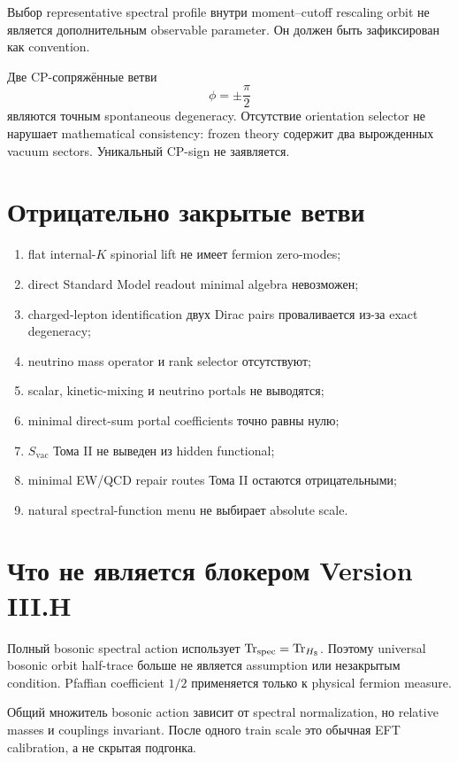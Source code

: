 Выбор representative spectral profile внутри moment--cutoff rescaling
orbit не является дополнительным observable parameter. Он должен быть
зафиксирован как convention.

Две CP-сопряжённые ветви
\begin{equation}
 \phi=\pm\frac{\pi}{2}
\end{equation}
являются точным spontaneous degeneracy. Отсутствие orientation selector
не нарушает mathematical consistency: frozen theory содержит два
вырожденных vacuum sectors. Уникальный CP-sign не заявляется.

\section{Отрицательно закрытые ветви}

\begin{enumerate}
 \item flat internal-\(K\) spinorial lift не имеет fermion zero-modes;
 \item direct Standard Model readout minimal algebra невозможен;
 \item charged-lepton identification двух Dirac pairs проваливается из-за
 exact degeneracy;
 \item neutrino mass operator и rank selector отсутствуют;
 \item scalar, kinetic-mixing и neutrino portals не выводятся;
 \item minimal direct-sum portal coefficients точно равны нулю;
 \item \(S_{\mathrm{vac}}\) Тома II не выведен из hidden functional;
 \item minimal EW/QCD repair routes Тома II остаются отрицательными;
 \item natural spectral-function menu не выбирает absolute scale.
\end{enumerate}

\section{Что не является блокером Version III.H}

Полный bosonic spectral action использует
\(\operatorname{Tr}_{\mathrm{spec}}=\operatorname{Tr}_{H_8}\). Поэтому universal bosonic
orbit half-trace больше не является assumption или незакрытым condition.
Pfaffian coefficient \(1/2\) применяется только к physical fermion
measure.

Общий множитель bosonic action зависит от spectral normalization, но
relative masses и couplings invariant. После одного train scale это
обычная EFT calibration, а не скрытая подгонка.

